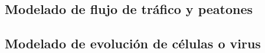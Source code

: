 \subsection{Modelado de flujo de tráfico y peatones}

\subsection{Modelado de evolución de células o virus}







